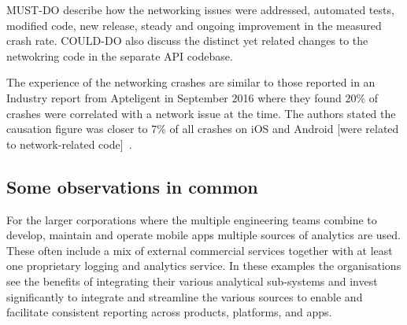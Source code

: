 MUST-DO describe how the networking issues were addressed, automated tests, modified code, new release, steady and ongoing improvement in the measured crash rate. COULD-DO also discuss the distinct yet related changes to the netwokring code in the separate API codebase.

The experience of the networking crashes are similar to those reported in an Industry report from Apteligent in September 2016 where they found 20\% of crashes were correlated with a network issue at the time. The authors stated the causation figure was closer to 7\% of all crashes on iOS and Android [were related to network-related code]~\citep{apteligent2016_data_report_network_crash_edition}. %

\subsection{Some observations in common}
For the larger corporations where the multiple engineering teams combine to develop, maintain and operate mobile apps multiple sources of analytics are used. These often include a mix of external commercial services together with at least one proprietary logging and analytics service. In these examples the organisations see the benefits of integrating their various analytical sub-systems and invest significantly to integrate and streamline the various sources to enable and facilitate consistent reporting across products, platforms, and apps.
